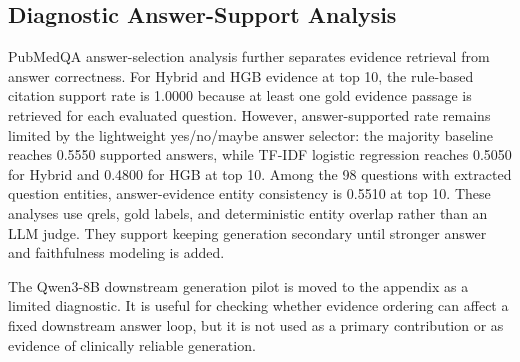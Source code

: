 \subsection{Diagnostic Answer-Support Analysis}

PubMedQA answer-selection analysis further separates evidence retrieval from answer correctness. For Hybrid and HGB evidence at top 10, the rule-based citation support rate is 1.0000 because at least one gold evidence passage is retrieved for each evaluated question. However, answer-supported rate remains limited by the lightweight yes/no/maybe answer selector: the majority baseline reaches 0.5550 supported answers, while TF-IDF logistic regression reaches 0.5050 for Hybrid and 0.4800 for HGB at top 10. Among the 98 questions with extracted question entities, answer-evidence entity consistency is 0.5510 at top 10. These analyses use qrels, gold labels, and deterministic entity overlap rather than an LLM judge. They support keeping generation secondary until stronger answer and faithfulness modeling is added.

The Qwen3-8B downstream generation pilot is moved to the appendix as a limited diagnostic. It is useful for checking whether evidence ordering can affect a fixed downstream answer loop, but it is not used as a primary contribution or as evidence of clinically reliable generation.
